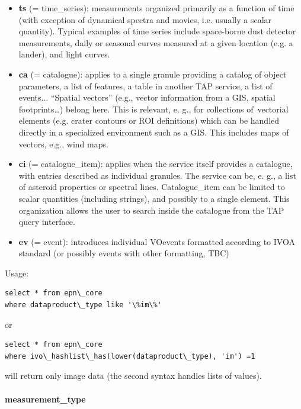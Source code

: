 \documentclass[11pt,a4paper]{ivoa}
\begin{document}
\begin{itemize}
\item \textbf{ts }(= time\_series): measurements organized primarily as a function of time (with exception of dynamical spectra and movies, i.e. usually a scalar quantity). Typical examples of time series include space-borne dust detector measurements, daily or seasonal curves measured at a given location (e.g. a lander), and light curves.
\item \textbf{ca }(= catalogue): applies to a single granule providing a catalog of object parameters, a list of features, a table in another TAP service, a list of events... ``Spatial vectors'' (e.g., vector information from a GIS, spatial footprints…) belong here. This is relevant, e. g., for collections of vectorial elements (e.g. crater contours or ROI definitions) which can be handled directly in a specialized environment such as a GIS. This includes maps of vectors, e.g., wind maps.
\item \textbf{ci }(= catalogue\_item): applies when the service itself provides a catalogue, with entries described as individual granules. The service can be, e. g., a list of asteroid properties or spectral lines. Catalogue\_item can be limited to scalar quantities (including strings), and possibly to a single element. This organization allows the user to search inside the catalogue from the TAP query interface.
\item \textbf{ev} (= event): introduces individual VOevents formatted according to IVOA standard (or possibly events with other formatting, TBC)
\end{itemize}

Usage:






\begin{verbatim}select * from epn\_core 
where dataproduct\_type like '\%im\%'\end{verbatim}




or 






\begin{verbatim}select * from epn\_core 
where ivo\_hashlist\_has(lower(dataproduct\_type), 'im') =1\end{verbatim}




will return only image data (the second syntax handles lists of values).

\paragraph{measurement\_type}
\end{document}
